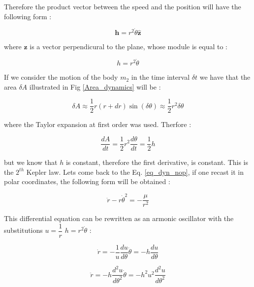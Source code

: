 \documentclass[12pt,%
               a4paper,%
               oneside,openany,%
               titlepage,%
               headinclude,footinclude,%
               BCOR5mm,%
               cleardoublepage=empty,%
               tablecaptionabove,%
               floatperchapter,
               ]{scrreprt}                 %
\begin{document}
Therefore the product vector between the speed and the position will have the following form \cite{murray1999solar}:

\begin{equation}
\textbf{h}=r^{2}\dot{\theta}\hat{\textbf{z}}
\end{equation}

where $\textbf{z}$ is a vector perpendicural to the plane, whose module is equal to \cite{murray1999solar}:

\begin{equation}
h=r^{2}\dot{\theta}
\end{equation}

If we consider the motion of the body $m_{2}$ in the time interval $\delta t$ we have that the area $\delta A$ illustrated in Fig \ref{Area_dynamics} will be \cite{murray1999solar}:

\begin{equation}
\delta A \approx \dfrac{1}{2} r(r+dr)\sin(\delta\theta) \approx  \dfrac{1}{2} r^{2}\delta\theta
\end{equation}

where the Taylor expansion at first order was used. Therfore  \cite{murray1999solar}:

\begin{equation}
\dfrac{dA}{dt}=\dfrac{1}{2}r^{2}\dfrac{d\theta}{dt}=\dfrac{1}{2}h
\end{equation}

but we know that $h$ is constant, therefore the first derivative, is constant. This is the $2^{th}$ Kepler law. Lets come back to the Eq. \ref{eq_dyn_nop}, if one recast it in polar coordinates, the following form will be obtained \cite{murray1999solar}:

\begin{equation}
\ddot{r}-r\dot{\theta}^{2}=-\frac{\mu}{r^{2}}
\end{equation}

This differential equation can be rewritten as an armonic oscillator with the  substitutions $u=\dfrac{1}{r}$ $h=r^{2}\dot{\theta}$ \cite{murray1999solar}:

\begin{equation}
\dot{r}=-\frac{1}{u}\dfrac{du}{d\theta}\dot{\theta}=-h\frac{du}{d\theta}
\end{equation}

\begin{equation}
\ddot{r}=-h\dfrac{d^{2}u}{d\theta^{2}}\dot{\theta}=-h^{2}u^{2}\frac{d^{2}u}{d\theta^{2}}
\end{equation}
\end{document}
